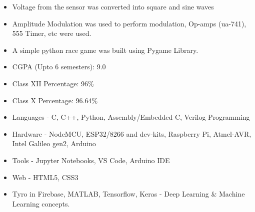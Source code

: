 
\smallskip
\smallskip
\smallskip
\smallskip
\smallskip
{}
\begin{itemize}
\item Voltage from the sensor was converted into square and sine waves
\item Amplitude Modulation was used to perform modulation, Op-amps (ua-741), 555 Timer, etc were used.

\end{itemize}

\divider

\begin{itemize}
\item A simple python race game was built using Pygame Library.
\end{itemize}

\begin{itemize}
    \item CGPA (Upto 6 semesters): 9.0
\end{itemize}

\divider

\begin{itemize}
    \item Class XII Percentage: 96\%
\end{itemize}

\divider

\begin{itemize}
    \item Class X Percentage: 96.64\%
\end{itemize}


\begin{itemize}
\item Languages - C, C++, Python, Assembly/Embedded C,  Verilog Programming 
\item Hardware - NodeMCU, ESP32/8266 and dev-kits, Raspberry Pi, Atmel-AVR, Intel Galileo gen2, Arduino
\item Tools - Jupyter Notebooks, VS Code, Arduino IDE
\item Web - HTML5, CSS3
\item Tyro in Firebase, MATLAB, Tensorflow, Keras - Deep Learning \& Machine Learning concepts.
\end{itemize}

